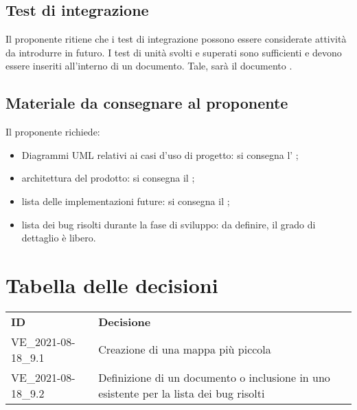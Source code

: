 \documentclass[]{article}
\begin{document}
	\subsection{Test di integrazione}
	Il proponente ritiene che i test di integrazione possono essere considerate attività da introdurre in futuro. I test di unità svolti e superati sono sufficienti e devono essere inseriti all'interno di un documento. Tale, sarà il documento .
	
	\subsection{Materiale da consegnare al proponente}
	Il proponente richiede:
	\begin{itemize}
		\item Diagrammi UML relativi ai casi d'uso di progetto: si consegna l' ;
		\item architettura del prodotto: si consegna il ;
		\item lista delle implementazioni future: si consegna il ;
		\item lista dei bug risolti durante la fase di sviluppo: da definire, il grado di dettaglio è libero.
	\end{itemize}
	
	
	
	\newpage

	\section{Tabella delle decisioni}

	\begin{table} [h!]
		\begin{center}
			\begin{tabular} { m{4cm} m{14cm} }
				\rowcolor{lightgray}
				\textbf{ID} & \textbf{Decisione}\\
				VE\_2021-08-18\_9.1 & Creazione di una mappa più piccola\\
					VE\_2021-08-18\_9.2 & Definizione di un documento o inclusione in uno esistente per la lista dei bug risolti \\
			\end{tabular}
		\end{center}
	\end{table}
\end{document}
